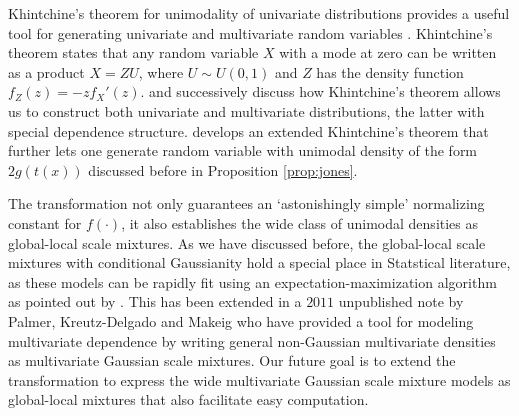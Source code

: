 \documentclass[letterpaper,11pt]{article}
\begin{document}
Khintchine's theorem for unimodality of univariate distributions provides a useful tool for generating univariate and multivariate random variables \citep{bryson1982constructing}. Khintchine's theorem states that any random variable $X$ with a mode at zero can be written as a product $X = ZU$, where $U \sim U(0,1)$ and $Z$ has the density function $f_Z(z) = -zf_{X}'(z)$. \citep{bryson1982constructing} and successively \cite{jones2010distributions,jones2012khintchine} discuss how Khintchine's theorem allows us to construct both univariate and multivariate distributions, the latter with special dependence structure. \cite{jones2014generating} develops an extended Khintchine's theorem that further lets one generate random variable with unimodal density of the form $2g(t(x))$ discussed before in Proposition \ref{prop:jones}. 

The \CS transformation not only guarantees an `astonishingly simple' normalizing constant for $f(\cdot)$, it also establishes the wide class of unimodal densities as global-local scale mixtures. As we have discussed before, the global-local scale mixtures with conditional Gaussianity hold a special place in Statstical literature, as these models can be rapidly fit using an expectation-maximization algorithm as pointed out by \cite{polson2013data}. This has been extended in a $2011$ unpublished note by Palmer, Kreutz-Delgado and Makeig who have provided a tool for modeling multivariate dependence by writing general non-Gaussian multivariate densities as multivariate Gaussian scale mixtures. Our future goal is to extend the \CS transformation to express the wide multivariate Gaussian scale mixture models as global-local mixtures that also facilitate easy computation. \par
\end{document}
